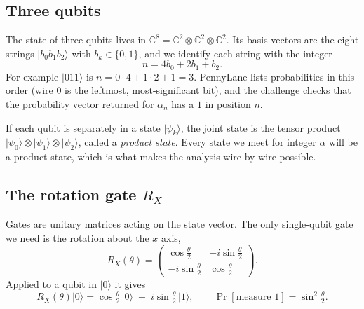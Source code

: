 \documentclass[11pt,a4paper]{article}
\newcommand{\ket}[1]{\lvert #1 \rangle}
\newcommand{\RX}{R_X}
\newcommand{\C}{\mathbb{C}}
\theoremstyle{plain}
\theoremstyle{definition}
\theoremstyle{remark}
\begin{document}
\subsection{Three qubits}

The state of three qubits lives in $\C^8 = \C^2\otimes\C^2\otimes\C^2$. Its basis vectors are the
eight strings $\ket{b_0 b_1 b_2}$ with $b_k\in\{0,1\}$, and we identify each string with the
integer
\begin{equation}\label{eq:binary}
 n = 4b_0 + 2b_1 + b_2 .
\end{equation}
For example $\ket{011}$ is $n = 0\cdot4 + 1\cdot 2 + 1 = 3$. PennyLane lists probabilities in this
order (wire $0$ is the leftmost, most-significant bit), and the challenge checks that the
probability vector returned for $\alpha_n$ has a $1$ in position $n$.

If each qubit is separately in a state $\ket{\psi_k}$, the joint state is the tensor product
$\ket{\psi_0}\otimes\ket{\psi_1}\otimes\ket{\psi_2}$, called a \emph{product state}. Every state
we meet for integer $\alpha$ will be a product state, which is what makes the analysis
wire-by-wire possible.

\subsection{The rotation gate $\RX$}

Gates are unitary matrices acting on the state vector. The only single-qubit gate we need is
the rotation about the $x$ axis,
\begin{equation}\label{eq:rx}
\RX(\theta) = \begin{pmatrix} \cos\frac{\theta}{2} & -i\sin\frac{\theta}{2}\\[2pt]
                              -i\sin\frac{\theta}{2} & \cos\frac{\theta}{2}\end{pmatrix}.
\end{equation}
Applied to a qubit in $\ket{0}$ it gives
\begin{equation}\label{eq:rx0}
\RX(\theta)\ket{0} = \cos\tfrac{\theta}{2}\,\ket{0} \;-\; i\sin\tfrac{\theta}{2}\,\ket{1},
\qquad
\Pr[\text{measure }1] = \sin^2\tfrac{\theta}{2}.
\end{equation}
\end{document}
